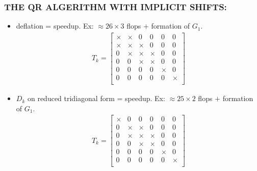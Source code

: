 \documentclass[a4paper,8pt]{beamer} %
\newcommand{\smatrix}[1]{\left[\begin{matrix} #1 \end{matrix}\right]}
\begin{document}
\begin{frame} %
\frametitle{THE QR ALGERITHM WITH IMPLICIT SHIFTS:} 
\begin{itemize}
	\item deflation = speedup. Ex: $\approx 26 \times 3$ flops $+$ formation of $G_1$.
		\begin{align}
			T_k = \smatrix{
				\times & \times & 		0 	& 0 & 0 & 0 \\
				\times & \times & \times 	& 0 & 0 & 0 \\
				0 & \times & \times	& \times 	& 0 & 0 \\
				0 &  0 & \times	& \times 		& 0 & 0 \\
				0 &  0 & 0	& 0 	& \times & 0 \\
				0 &  0 & 0	& 0 	& 0 & \times \\
			}
		\end{align}
	\item $D_k$ on reduced tridiagonal form = speedup. Ex: $\approx 25\times2$ flops $+$ formation of $G_1$.
		\begin{align}
			T_k = \smatrix{
				\times & 0 & 		0 	& 0 & 0 & 0 \\
				0 & \times & \times 	& 0 & 0 & 0 \\
				0 & \times & \times	& \times 	& 0 & 0 \\
				0 &  0 & \times	& \times 		& 0 & 0 \\
				0 &  0 & 0	& 0 	& \times & 0 \\
				0 &  0 & 0	& 0 	& 0 & \times \\
			}
		\end{align}
\end{itemize}
\end{frame}%
\end{document}
